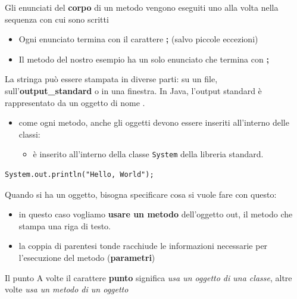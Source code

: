 \begin{frame}
\begin{block}{}
Gli enunciati del \textbf{corpo} di un metodo vengono eseguiti uno alla volta \alert{nella sequenza con cui sono scritti}
\end{block}

\begin{block}{}
\begin{itemize}
\item Ogni enunciato termina con il carattere \textbf{\alert{;}} (salvo piccole eccezioni)
\item Il metodo  del nostro esempio ha un solo enunciato che termina con \textbf{\alert{;}}
\end{itemize}
\end{block}

\begin{block}{}
La stringa  può essere stampata in diverse parti: su un file, sull'\textbf{output\_standard}
o in una finestra. In Java, l'output standard è rappresentato da un oggetto di nome .
\begin{itemize}
\item come ogni metodo, anche gli oggetti devono essere inseriti all'interno delle classi:
\begin{itemize}
\item {} è inserito all'interno della classe \texttt{System} della \alert{libreria standard}.
\end{itemize}
\end{itemize}
\end{block}
\end{frame}

\begin{frame}[fragile]
\begin{lstlisting}
System.out.println("Hello, World");
\end{lstlisting}
\begin{block}{}
Quando si ha un oggetto, bisogna specificare cosa si vuole fare con questo:
\begin{itemize}
\item in questo caso vogliamo \textbf{usare un metodo} dell'oggetto \alert{out}, il metodo  che stampa una riga 
di testo.
\item la coppia di parentesi tonde racchiude le informazioni necessarie per l'esecuzione del metodo (\textbf{parametri})
\end{itemize}
\end{block}
\begin{block}{Il punto}
A volte il carattere \textbf{punto} significa \textit{usa un oggetto di una classe}, altre volte \textit{usa un metodo
di un oggetto}
\end{block}
\end{frame}

